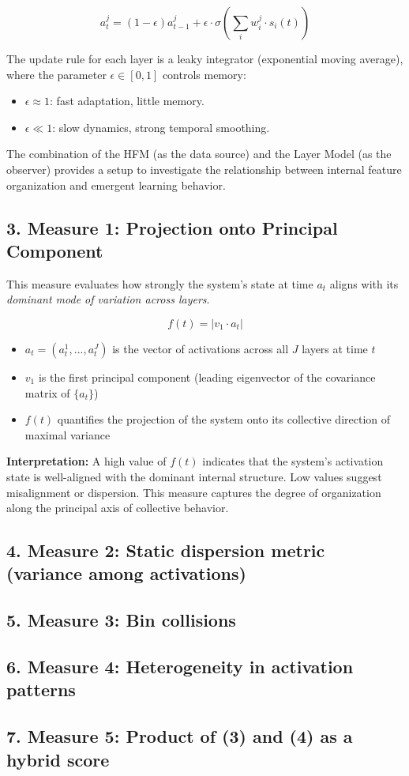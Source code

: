 \documentclass[10pt,a4paper,twoside]{article}
\begin{document}
\[
a^j_t = (1 - \epsilon) a^j_{t-1} + \epsilon \cdot \sigma\left( \sum_{i} w^j_i \cdot s_i(t) \right)
\]

The update rule for each layer is a leaky integrator (exponential moving average), where the parameter $\epsilon \in [0,1]$ controls memory:
\begin{itemize}
    \item $\epsilon \approx 1$: fast adaptation, little memory.
    \item $\epsilon \ll 1$: slow dynamics, strong temporal smoothing.
\end{itemize}

The combination of the HFM (as the data source) and the Layer Model (as the observer) provides a setup to investigate the relationship between internal feature organization and emergent learning behavior.

\subsection*{3. Measure 1: Projection onto Principal Component}

This measure evaluates how strongly the system's state at time $a_t$ aligns with its \textit{dominant mode of variation across layers}.

\[
f(t) = \left|v_1 \cdot a_t\right|
\]

\begin{itemize}
    \item $a_t = (a^1_t, ..., a^J_t)$ is the vector of activations across all $J$ layers at time $t$
    \item $v_1$ is the first principal component (leading eigenvector of the covariance matrix of $\{a_t\}$)
    \item $f(t)$ quantifies the projection of the system onto its collective direction of maximal variance
\end{itemize}

\textbf{Interpretation:}  
A high value of $f(t)$ indicates that the system's activation state is well-aligned with the dominant internal structure. Low values suggest misalignment or dispersion. This measure captures the degree of organization along the principal axis of collective behavior.




\subsection*{4. Measure 2: Static dispersion metric (variance among activations)}

\subsection*{5. Measure 3: Bin collisions}

\subsection*{6. Measure 4: Heterogeneity in activation patterns}

\subsection*{7. Measure 5: Product of (3) and (4) as a hybrid score}
\end{document}
